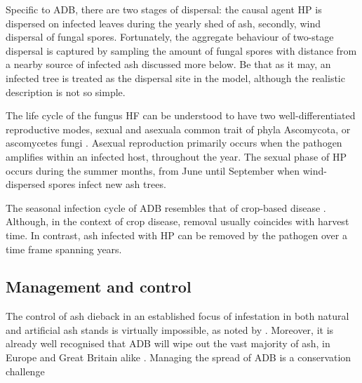 Specific to ADB, there are two stages of dispersal: the causal agent HP is dispersed on infected leaves during the yearly shed of ash, secondly, wind dispersal of fungal spores. Fortunately, the aggregate behaviour of two-stage dispersal is captured by sampling the amount of fungal spores with distance from a nearby source of infected ash \cite{grosdidier2018tracking}\textemdash discussed more below. 
Be that as it may, an infected tree is treated as the dispersal site in the model, although the realistic description is not so simple.

The life cycle of the fungus HF can be understood to have two well-differentiated reproductive modes, sexual and asexual\textemdash a common trait of phyla Ascomycota, or ascomycetes fungi \cite{hawker2016physiology}.
Asexual reproduction primarily occurs when the pathogen amplifies within an infected host, throughout the year. 
The sexual phase of HP occurs during the summer months, from June until September when wind-dispersed spores infect new ash trees.

The seasonal infection cycle of ADB resembles that of crop-based disease \cite{tankam2020modelling}. Although, in the context of crop disease, removal usually coincides with harvest time. In contrast, ash infected with HP can be removed by the pathogen over a time frame spanning years.


\subsection{Management and control}

The control of ash dieback in an established focus of infestation in both natural and artificial ash stands is virtually impossible, as noted by \cite{havrdova2017environmental}. Moreover, it is already well recognised that ADB will wipe out the vast majority of ash, in Europe and Great Britain alike \cite{ash-dieback-costs}. Managing the spread of ADB is a conservation challenge \cite{pautasso2013european} %



